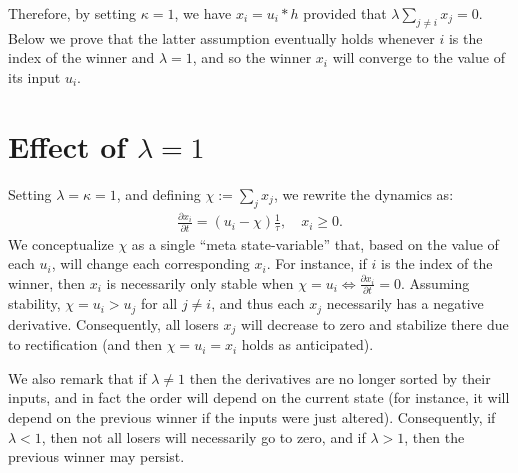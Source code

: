 Therefore, by setting $\kappa = 1$, we have $x_i = u_i \ast h$ provided that $\lambda \sum_{j \ne i} x_j = 0$.
Below we prove that the latter assumption eventually holds whenever $i$ is the index of the winner and $\lambda = 1$, and so the winner $x_i$ will converge to the value of its input $u_i$.


\section{Effect of \texorpdfstring{$\lambda = 1$}{λ=1}}

Setting $\lambda = \kappa = 1$, and defining $\chi := \sum_j x_j$, we rewrite the dynamics as:
\begin{equation} \label{eq:um-special}
    \begin{split}
        \frac{{\partial x}_i}{\partial t} = \left(u_i - \chi \right) \frac{1}{\tau}, \quad x_i \ge 0.
    \end{split}
\end{equation}
We conceptualize $\chi$ as a single ``meta state-variable'' that, based on the value of each $u_i$, will change each corresponding $x_i$.
For instance, if $i$ is the index of the winner, then $x_i$ is necessarily only stable when $\chi = u_i \iff \frac{{\partial x}_i}{\partial t} = 0$.
Assuming stability, $\chi = u_i > u_j$ for all $j \ne i$, and thus each $x_j$ necessarily has a negative derivative.
Consequently, all losers $x_j$ will decrease to zero and stabilize there due to rectification (and then $\chi = u_i = x_i$ holds as anticipated).

We also remark that if $\lambda \ne 1$ then the derivatives are no longer sorted by their inputs, and in fact the order will depend on the current state (for instance, it will depend on the previous winner if the inputs were just altered). Consequently, if $\lambda < 1$, then not all losers will necessarily go to zero, and if $\lambda > 1$, then the previous winner may persist.
